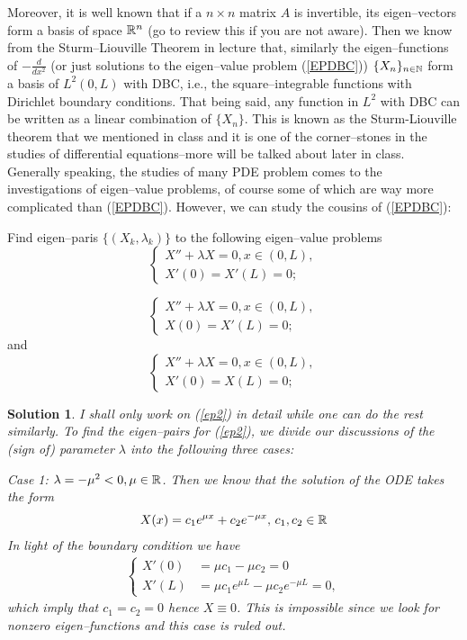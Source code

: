 \documentclass[6pt]{article}
\newtheorem{solution}{Solution}
\numberwithin{equation}{section}
\def\mathbb{\Bbb}
\begin{document}
\begin{enumerate}
Moreover, it is well known that if a $n\times n$ matrix $A$ is invertible, its eigen--vectors form a basis of space $\mathbb R^n$ (go to review this if you are not aware).  Then we know from the Sturm--Liouville Theorem in lecture that, similarly the eigen--functions of $-\frac{d}{dx^2}$ (or just solutions to the eigen--value problem (\ref{EPDBC})) $\{X_n\}_{n\in\mathbb N}$ form a basis of $L^2(0,L)$ with DBC, i.e., the square--integrable functions with Dirichlet boundary conditions.  That being said, any function in $L^2$ with DBC can be written as a linear combination of $\{X_n\}$.  This is known as the Sturm-Liouville theorem that we mentioned in class and it is one of the corner--stones in the studies of differential equations--more will be talked about later in class.  Generally speaking, the studies of many PDE problem comes to the investigations of eigen--value problems, of course some of which are way more complicated than (\ref{EPDBC}).  However, we can study the cousins of (\ref{EPDBC}):

Find eigen--paris $\{(X_k, \lambda_k)\}$ to the following eigen--value problems
\begin{equation}\label{ep2}
\left\{
\begin{array}{ll}
X''+\lambda X=0, x\in (0,L),\\
X'(0)=X'(L)=0;
\end{array}
\right.
\end{equation}

\begin{equation}\label{ep3}
\left\{
\begin{array}{ll}
X''+\lambda X=0, x\in (0,L),\\
X(0)=X'(L)=0;
\end{array}
\right.
\end{equation}
and
\begin{equation}\label{ep4}
\left\{
\begin{array}{ll}
X''+\lambda X=0, x\in (0,L),\\
X'(0)=X(L)=0;
\end{array}
\right.
\end{equation}
\begin{solution}
I shall only work on (\ref{ep2}) in detail while one can do the rest similarly.  To find the eigen--pairs for (\ref{ep2}), we divide our discussions of the (sign of) parameter $\lambda$ into the following three cases:

Case 1: $\lambda=-\mu^2<0, \mu\in \mathbb R$.  Then we know that the solution of the ODE takes the form
\begin{align*}
X(x)=c_1 e^{\mu x}+c_2 e^{-\mu x}, \, c_1, c_2 \in \mathbb R
\end{align*}
In light of the boundary condition we have
\begin{align*}
\begin{cases}
X'(0)&=\mu c_1-\mu c_2=0 \\
X'(L)&=\mu c_1 e^{\mu L}-\mu c_2 e^{-\mu L}=0,
\end{cases}
\end{align*}
which imply that $c_1=c_2=0$ hence $X\equiv 0$.  This is impossible since we look for nonzero eigen--functions and this case is ruled out.



\end{solution}
\end{enumerate}
\end{document}
